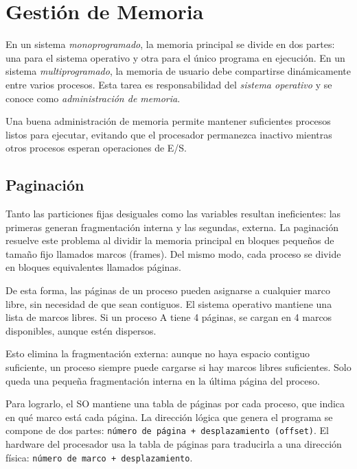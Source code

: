 \chapter{Gestión de Memoria} \label{chpt:memoria}

En un sistema \textit{monoprogramado}, la memoria principal se divide en dos partes: una para el sistema operativo y otra para el único programa en ejecución. En un sistema \textit{multiprogramado}, la memoria de usuario debe compartirse dinámicamente entre varios procesos. Esta tarea es responsabilidad del \textit{sistema operativo} y se conoce como \textit{administración de memoria}.

Una buena administración de memoria permite mantener suficientes procesos listos para ejecutar, evitando que el procesador permanezca inactivo mientras otros procesos esperan operaciones de E/S.





\section{Paginación}

Tanto las particiones fijas desiguales como las variables resultan ineficientes: las primeras generan fragmentación interna y las segundas, externa. La paginación resuelve este problema al dividir la memoria principal en bloques pequeños de tamaño fijo llamados marcos (frames). Del mismo modo, cada proceso se divide en bloques equivalentes llamados páginas.

De esta forma, las páginas de un proceso pueden asignarse a cualquier marco libre, sin necesidad de que sean contiguos. El sistema operativo mantiene una lista de marcos libres. Si un proceso A tiene 4 páginas, se cargan en 4 marcos disponibles, aunque estén dispersos.

Esto elimina la fragmentación externa: aunque no haya espacio contiguo suficiente, un proceso siempre puede cargarse si hay marcos libres suficientes. Solo queda una pequeña fragmentación interna en la última página del proceso.

Para lograrlo, el SO mantiene una tabla de páginas por cada proceso, que indica en qué marco está cada página. La dirección lógica que genera el programa se compone de dos partes: \texttt{número de página + desplazamiento (offset)}. El hardware del procesador usa la tabla de páginas para traducirla a una dirección física: \texttt{número de marco + desplazamiento}.

